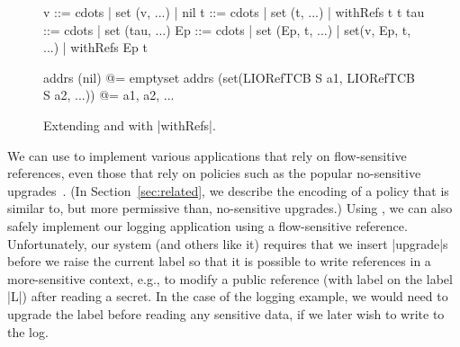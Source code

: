 \begin{figure} %
\small
\begin{code}
v    ::= cdots  | set (v, ...) | nil
t    ::= cdots  | set (t, ...) | withRefs t t
tau  ::= cdots  | set (tau, ...)
Ep   ::= cdots  | set (Ep, t, ...) | set(v, Ep, t, ...) | withRefs Ep t 

addrs (nil)                                       @= emptyset
addrs (set(LIORefTCB S a1, LIORefTCB S a2, ...))  @= {a1, a2, ...}
\end{code}
\caption{Extending \liofs{} and \lioafs{} with |withRefs|.\label{fig:sos:withRefs}}
\end{figure}

We can use \liofs{} to implement various applications that rely on
flow-sensitive references, even those that rely on policies such as the
popular no-sensitive upgrades~\cite{Austin:Flanagan:PLAS09}.
%
(In Section~\ref{sec:related}, we describe the encoding of a policy that is
similar to, but more permissive than, no-sensitive upgrades.)
%
Using \liofs{}, we can also safely implement our logging application using a
flow-sensitive reference.
%
Unfortunately, our system (and others like it) requires that we insert
|upgrade|s before we raise the current label so that it is possible to 
write references in a more-sensitive context, e.g., to modify a public reference
(with label on the label |L|) after reading a secret. 
%
In the case of the logging example, we would need to upgrade the label
before reading any sensitive data, if we later wish to write to
the log.

